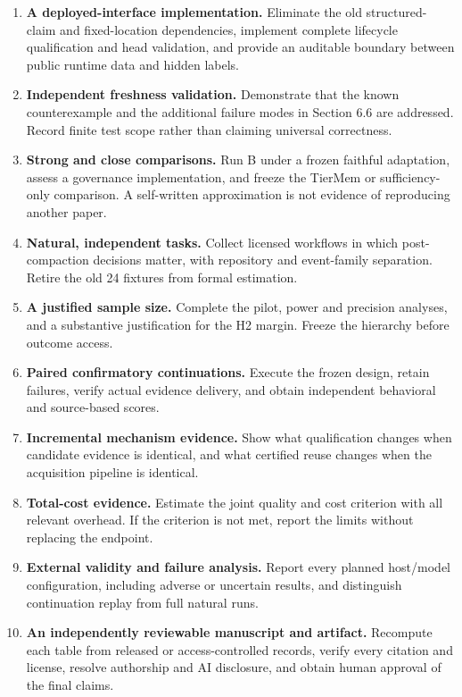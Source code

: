 \begin{enumerate}
\def\labelenumi{\arabic{enumi}.}
\tightlist
\item
  \textbf{A deployed-interface implementation.} Eliminate the old
  structured-claim and fixed-location dependencies, implement complete
  lifecycle qualification and head validation, and provide an auditable
  boundary between public runtime data and hidden labels.
\item
  \textbf{Independent freshness validation.} Demonstrate that the known
  counterexample and the additional failure modes in Section 6.6 are
  addressed. Record finite test scope rather than claiming universal
  correctness.
\item
  \textbf{Strong and close comparisons.} Run B under a frozen faithful
  adaptation, assess a governance implementation, and freeze the TierMem
  or sufficiency-only comparison. A self-written approximation is not
  evidence of reproducing another paper.
\item
  \textbf{Natural, independent tasks.} Collect licensed workflows in
  which post-compaction decisions matter, with repository and
  event-family separation. Retire the old 24 fixtures from formal
  estimation.
\item
  \textbf{A justified sample size.} Complete the pilot, power and
  precision analyses, and a substantive justification for the H2 margin.
  Freeze the hierarchy before outcome access.
\item
  \textbf{Paired confirmatory continuations.} Execute the frozen design,
  retain failures, verify actual evidence delivery, and obtain
  independent behavioral and source-based scores.
\item
  \textbf{Incremental mechanism evidence.} Show what qualification
  changes when candidate evidence is identical, and what certified reuse
  changes when the acquisition pipeline is identical.
\item
  \textbf{Total-cost evidence.} Estimate the joint quality and cost
  criterion with all relevant overhead. If the criterion is not met,
  report the limits without replacing the endpoint.
\item
  \textbf{External validity and failure analysis.} Report every planned
  host/model configuration, including adverse or uncertain results, and
  distinguish continuation replay from full natural runs.
\item
  \textbf{An independently reviewable manuscript and artifact.}
  Recompute each table from released or access-controlled records,
  verify every citation and license, resolve authorship and AI
  disclosure, and obtain human approval of the final claims.
\end{enumerate}

